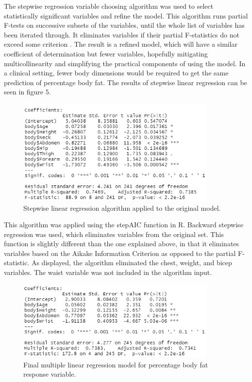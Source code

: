 \documentclass[12pt]{article}
\begin{document}
The stepwise regression variable choosing algorithm was used to select statistically significant variables and refine the model. This algorithm runs partial F-tests on successive subsets of the variables, until the whole list of variables has been iterated through. It eliminates variables if their partial F-statistics do not exceed some criterion \cite{Tamhane}. The result is a refined model, which will have a similar coefficient of determination but fewer variables, hopefully mitigating multicollinearity and simplifying the practical components of using the model. In a clinical setting, fewer body dimensions would be required to get the same prediction of percentage body fat. The results of stepwise linear regression can be seen in figure 5.

\begin{figure}[h]
\centering
\includegraphics[width = 100mm]{stepmodel_output.PNG}
\caption{Stepwise linear regression algorithm applied to the original model.}
\label{stepmodel}
\end{figure}

This algorithm was applied using the stepAIC function in R. Backward stepwise regression was used, which eliminates variables from the original set. This function is slightly different than the one explained above, in that it eliminates variables based on the Aikake Information Criterion as opposed to the partial F-statistic. As displayed, the algorithm eliminated the chest, weight, and bicep variables. The waist variable was not included in the algorithm input. 

\begin{figure}[h]
\centering
\includegraphics[width = 100mm]{stepmodel_reducedoutput.PNG}
\caption{Final multiple linear regression model for percentage body fat response variable.}
\label{stepmodel_reduced}
\end{figure}
\end{document}
